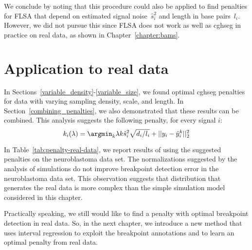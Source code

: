 \documentclass{article}
\begin{document}
We conclude by noting that this procedure could also be applied to
find penalties for FLSA that depend on estimated signal noise~$\hat
s_i^2$ and length in base pairs~$l_i$. However, we did not pursue this
since FLSA does not work as well as cghseg in practice on real data,
as shown in Chapter~\ref{chapter:bams}.



\newpage

\section{Application to real data}

In Sections~\ref{variable_density}-\ref{variable_size}, we found
optimal cghseg penalties for data with varying sampling density,
scale, and length. In Section~\ref{combining_penalties}, we also
demonstrated that these results can be combined. This analysis
suggests the following penalty, for every signal $i$:
\begin{equation}
  \label{eq:composite_penalty}
  k_i(\lambda) = 
  \argmin_k
  \lambda k \hat s_i^2 \sqrt{d_i/l_i}  +
  ||y_i - \hat y_i^k||^2_2
\end{equation}

In Table~\ref{tab:penalty-real-data}, we report results of using the
suggested penalties on the neuroblastoma data set. The normalizations
suggested by the analysis of simulations do not improve breakpoint
detection error in the neuroblastoma data set. This observation
suggests that distribution that generates the real data is more
complex than the simple simulation model considered in this chapter.

Practically speaking, we still would like to find a penalty with
optimal breakpoint detection in real data. So, in the next chapter, we
introduce a new method that uses interval regression to exploit the
breakpoint annotations and to learn an optimal penalty from real data.




\end{document}
